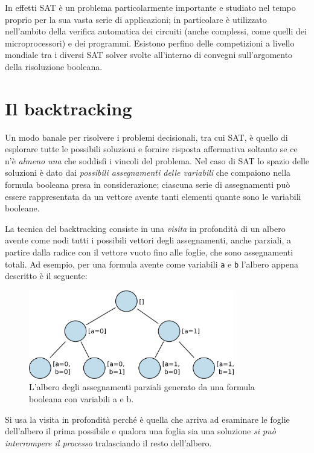 \documentclass[12pt, a4paper, twosides]{report}
\begin{document}
In effetti SAT è un problema particolarmente importante e studiato nel tempo proprio per la sua vasta serie di applicazioni; in particolare è utilizzato nell'ambito della verifica automatica dei circuiti (anche complessi, come quelli dei microprocessori) e dei programmi. Esistono perfino delle competizioni a livello mondiale tra i diversi SAT solver svolte all'interno di convegni sull'argomento della risoluzione booleana.




\section{Il backtracking}

Un modo banale per risolvere i problemi decisionali, tra cui SAT, è quello di esplorare tutte le possibili soluzioni e fornire risposta affermativa soltanto se ce n'è \textit{almeno una} che soddisfi i vincoli del problema. Nel caso di SAT lo spazio delle soluzioni è dato dai \textit{possibili assegnamenti delle variabili} che compaiono nella formula booleana presa in considerazione; ciascuna serie di assegnamenti può essere rappresentata da un vettore avente tanti elementi quante sono le variabili booleane.

La tecnica del backtracking consiste in una \textit{visita} in profondità di un albero avente come nodi tutti i possibili vettori degli assegnamenti, anche parziali, a partire dalla radice con il vettore vuoto fino alle foglie, che sono assegnamenti totali. Ad esempio, per una formula avente come variabili \verb|a| e \verb|b| l'albero appena descritto è il seguente:

\begin{figure}[ht]
\begin{center}
\includegraphics[width=0.8\textwidth]{albero.png}
\end{center}
\caption{L'albero degli assegnamenti parziali generato da una formula booleana con variabili a e b.}
\end{figure}

Si usa la visita in profondità perché è quella che arriva ad esaminare le foglie dell'albero il prima possibile e qualora una foglia sia una soluzione \textit{si può interrompere il processo} tralasciando il resto dell'albero.
\end{document}
